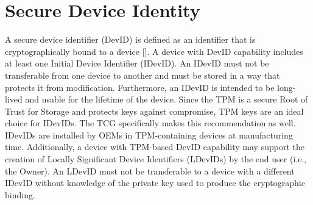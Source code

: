 \chapter{Secure Device Identity}


A secure device identifier (DevID) is defined as an identifier that is cryptographically bound to a device [\cite{DevIDSpec-IEEE}]. A device with DevID capability includes at least one Initial Device Identifier (IDevID). An IDevID must not be transferable from one device to another and must be stored in a way that protects it from modification. Furthermore, an IDevID is intended to be long-lived and usable for the lifetime of the device. Since the TPM is a secure Root of Trust for Storage and protects keys against compromise, TPM keys are an ideal choice for IDevIDs. The TCG specifically makes this recommendation as well. IDevIDs are installed by OEMs in TPM-containing devices at manufacturing time. Additionally, a device with TPM-based DevID capability may support the creation of Locally Significant Device Identifiers (LDevIDs) by the end user (i.e., the Owner). An LDevID must not be transferable to a device with a different IDevID without knowledge of the private key used to produce the cryptographic binding. 



